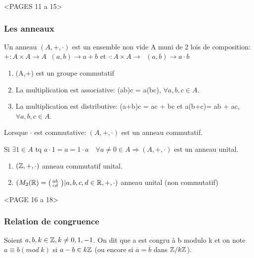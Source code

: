<PAGES 11 a 15>

\subsubsection{Les anneaux}

\begin{defn}
Un anneau $(A,+,\cdot)$ est un ensemble non vide A muni de 2 lois de composition: $+ : A \times A \rightarrow A \;\; (a,b) \rightarrow a+b$ et $\cdot : A \times A \rightarrow \;\; (a,b) \rightarrow a\cdot b$

\begin{enumerate}
	\item (A,+) est un groupe commutatif
	\item La multiplication est associative: (ab)c = a(bc), $\forall a,b,c \in A$.
	\item La multiplication est distributive: (a+b)c = ac + bc et a(b+c)= ab + ac, $\forall a,b,c \in A$.
\end{enumerate}
\end{defn}

\begin{defn}
Lorsque $\cdot$ est commutative: $(A,+,\cdot)$ est un anneau commutatif.

Si $\exists 1 \in A$ tq $a\cdot 1 = a = 1 \cdot a \quad \forall a \neq 0 \in A \Rightarrow (A,+,\cdot)$ est un anneau unital.
\end{defn}

\begin{exmp}
	\begin{enumerate}
	\item $(\mathbb{Z},+,\cdot)$ anneau commutatif unital.
	\item $(M_2 (\mathbb{R}) = { \bigl( \begin{smallmatrix} a b&\\c d& \end{smallmatrix}\bigr)  | a,b,c,d \in \mathbb{R} },+,\cdot )$ anneau unital (non commutatif) 
	\end{enumerate}
\end{exmp}

<PAGE 16 a 18>

\subsubsection{Relation de congruence}

\begin{defn}
Soient $a,b,k \in \mathbb{Z}, k \neq 0,1,-1$. On dit que a est congru à b modulo k et on note $a \equiv b(mod\;k)$ si $a-b \in k\mathbb{Z}$ (ou encore si $\overline{a} = \overline{b}$ dans $\mathbb{Z}/k\mathbb{Z}$). \\
\end{defn}

